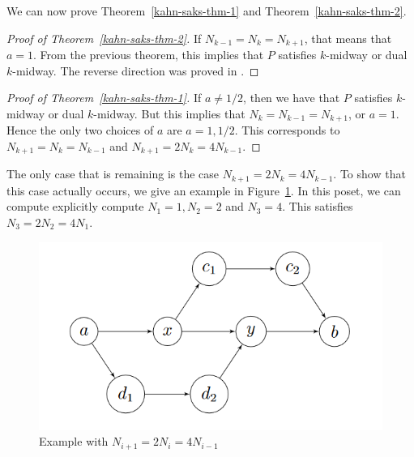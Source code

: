 \documentclass{puthesis-UG}
\begin{document}
We can now prove Theorem~\ref{kahn-saks-thm-1} and Theorem~\ref{kahn-saks-thm-2}. 

\begin{proof}[Proof of Theorem~\ref{kahn-saks-thm-2}]
	If $N_{k-1} = N_k = N_{k+1}$, that means that $a = 1$. From the previous theorem, this implies that $P$ satisfies $k$-midway or dual $k$-midway. The reverse direction was proved in \cite{chan2022extensions}. 
\end{proof}

\begin{proof}[Proof of Theorem~\ref{kahn-saks-thm-1}]
	If $a \neq 1/2$, then we have that $P$ satisfies $k$-midway or dual $k$-midway. But this implies that $N_k = N_{k-1} = N_{k+1}$, or $a = 1$. Hence the only two choices of $a$ are $a = 1, 1/2$. This corresponds to $N_{k+1} = N_k = N_{k-1}$ and $N_{k+1} = 2N_k = 4 N_{k-1}$. 
\end{proof}

The only case that is remaining is the case $N_{k+1} = 2N_k = 4 N_{k-1}$. To show that this case actually occurs, we give an example in Figure~\ref{fig:example-of-a-is-two}. In this poset, we can compute explicitly compute $N_1 = 1, N_2 = 2$ and $N_3 = 4$. This satisfies $N_3 = 2N_2 = 4N_1$. 

\begin{figure}[ht] 
	\begin{center}
		\includegraphics[scale = 0.8]{image6.png}
		\caption{Example with $N_{i+1} = 2N_i = 4 N_{i-1}$}
		\label{fig:example-of-a-is-two}
	\end{center}
\end{figure}
\end{document}
